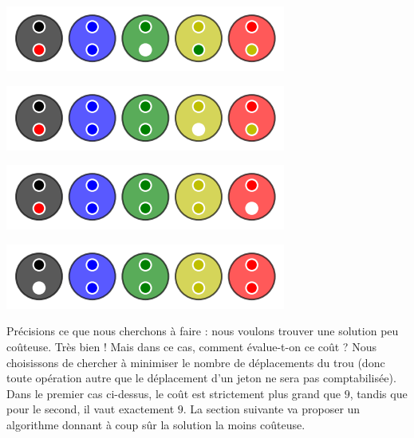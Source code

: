 \begin{multicols}{2}
\begin{center}
        \includegraphics[scale= 0.45]{content/optimal/where_do_we_go/tree_sol/006.png}

        \includegraphics[scale= 0.45]{content/optimal/where_do_we_go/tree_sol/007.png}

        \includegraphics[scale= 0.45]{content/optimal/where_do_we_go/tree_sol/008.png}

        \includegraphics[scale= 0.45]{content/optimal/where_do_we_go/tree_sol/009.png}
    \end{center}
\end{multicols}


\medskip

Précisions ce que nous cherchons à faire : nous voulons trouver une solution peu coûteuse. Très bien ! Mais dans ce cas, comment évalue-t-on ce coût ? Nous choisissons de chercher à minimiser le nombre de déplacements du trou (donc toute opération autre que le déplacement d'un jeton ne sera pas comptabilisée).
Dans le premier cas ci-dessus, le coût est strictement plus grand que $9$, tandis que pour le second, il vaut exactement $9$. La section suivante va proposer un algorithme donnant à coup sûr la solution la moins coûteuse.
